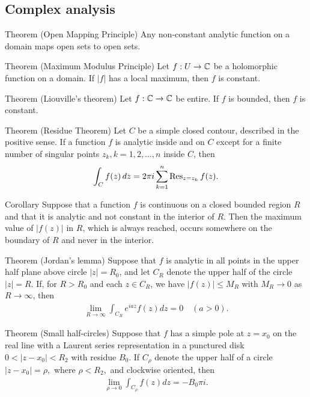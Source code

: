 \subsection{Complex analysis}
\begin{thmbox}{Theorem (Open Mapping Principle)}
Any non-constant analytic function on a domain maps open sets to open sets.
\end{thmbox}
\begin{thmbox}{Theorem (Maximum Modulus Principle)}
Let $f: U \to \mathbb{C}$ be a holomorphic function on a domain. If $\left|f\right|$ has a local maximum, then $f$ is constant.
\end{thmbox}
\begin{thmbox}{Theorem (Liouville's theorem)}
Let $f: \mathbb{C} \to \mathbb{C}$ be entire. If $f$ is bounded, then $f$ is constant.
\end{thmbox}
\begin{thmbox}{Theorem (Residue Theorem)}
Let $C$ be a simple closed contour, described in the positive sense. If a function $f$ is analytic inside and on $C$ except for a finite number of singular points $z_k,k=1,2,\ldots,n$ inside $C$, then
\begin{align*}
    \int_C f(z) \,dz = 2\pi i \sum_{k=1}^n \operatorname{Res}_{z = z_k} f(z).
\end{align*}
\end{thmbox}
\begin{thmbox}{Corollary}
Suppose that a function $f$ is continuous on a closed bounded region $R$ and that it is analytic and not constant in the interior of $R$. Then the maximum value of $|f(z)|$ in $R$, which is always reached, occurs somewhere on the boundary of $R$ and never in the interior.
\end{thmbox}
\begin{thmbox}{Theorem (Jordan's lemma)}
Suppose that $f$ is analytic in all points in the upper half plane above circle $|z|=R_0$, and let $C_R$ denote the upper half of the circle $|z|=R$. If, for $R>R_0$ and each $z\in C_R$, we have $|f(z)|\le M_R$ with $M_R\rightarrow 0$ as $R\rightarrow\infty$, then
\begin{align*}
    \lim_{R\rightarrow\infty}\int_{C_R} e^{iaz}f(z)dz=0\quad(a>0).
\end{align*}
\end{thmbox}
\begin{thmbox}{Theorem (Small half-circles)}
Suppose that $f$ has a simple pole at $z=x_0$ on the real line with a Laurent series representation in a punctured disk $0<|z-x_0|<R_2$ with residue $B_0.$ If $C_\rho$ denote the upper half of a circle $|z-x_0|=\rho,$ where $\rho<R_2,$ and clockwise oriented, then
\begin{align*}
\lim_{\rho\rightarrow0}    \int_{C_\rho}f(z)dz=-B_0\pi i.
\end{align*}
\end{thmbox}
